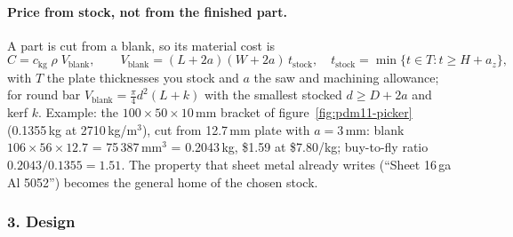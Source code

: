 \paragraph{Price from stock, not from the finished part.} A part is cut from a blank, so its material cost is
\[
  C = c_{\mathrm{kg}}\;\rho\;V_{\mathrm{blank}},\qquad
  V_{\mathrm{blank}} = (L + 2a)(W + 2a)\,t_{\mathrm{stock}},\quad t_{\mathrm{stock}} = \min\{t \in T : t \ge H + a_z\},
\]
with $T$ the plate thicknesses you stock and $a$ the saw and machining allowance; for round bar
$V_{\mathrm{blank}} = \tfrac{\pi}{4} d^2 (L + k)$ with the smallest stocked $d \ge D + 2a$ and kerf $k$. Example: the
$100\times50\times10$\,mm bracket of figure~\ref{fig:pdm11-picker} (0.1355\,kg at 2710\,kg/m$^3$), cut from 12.7\,mm plate with
$a = 3$\,mm: blank $106\times56\times12.7$ = 75\,387\,mm$^3$ = 0.2043\,kg, \$1.59 at \$7.80/kg; buy-to-fly ratio
$0.2043/0.1355 = 1.51$. The  property that sheet metal already writes (``Sheet 16\,ga Al 5052'') becomes the
general home of the chosen stock.

\subsubsection*{3. Design}

